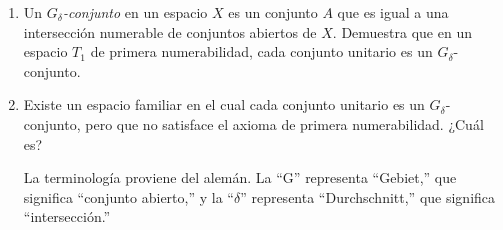 
\item 
    \begin{enumerate}
        \item Un \textit{$G_{\delta}$-conjunto} en un espacio $X$ es un conjunto $A$ que es igual a una intersección numerable de conjuntos abiertos de $X$. Demuestra que en un espacio $T_1$ de primera numerabilidad, cada conjunto unitario es un $G_{\delta}$-conjunto.
        \item Existe un espacio familiar en el cual cada conjunto unitario es un $G_{\delta}$-conjunto, pero que no satisface el axioma de primera numerabilidad. ¿Cuál es?  
        
        La terminología proviene del alemán. La ``G'' representa ``Gebiet,'' que significa ``conjunto abierto,'' y la ``$\delta$'' representa ``Durchschnitt,'' que significa ``intersección.''
    \end{enumerate}